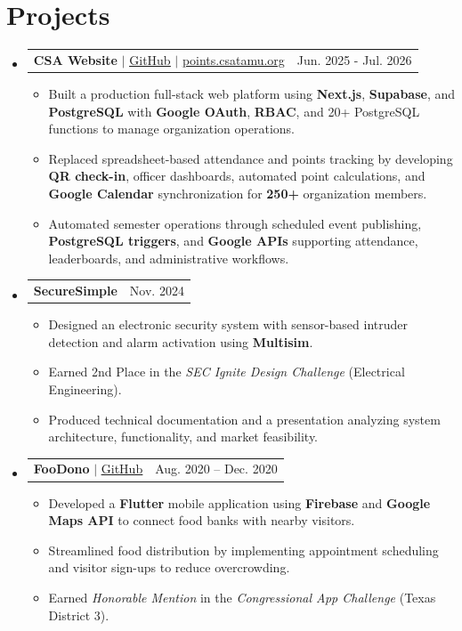 \documentclass[letterpaper,11pt]{article}
\makeatletter
\newcommand{\resumeItem}[1]{
  \item\small{
    {#1 \vspace{-2pt}}
  }
}
\newcommand{\resumeProjectHeading}[2]{
    \item
    \begin{tabular*}{0.97\textwidth}{l@{\extracolsep{\fill}}r}
      \small#1 & #2 \\
    \end{tabular*}\vspace{-7pt}
}
\newcommand{\resumeSubHeadingListStart}{\begin{itemize}[leftmargin=0.15in, label={}]}
\newcommand{\resumeSubHeadingListEnd}{\end{itemize}}
\newcommand{\resumeItemListStart}{\begin{itemize}}
\newcommand{\resumeItemListEnd}{\end{itemize}\vspace{-5pt}}
\makeatother
\begin{document}
\section{Projects}
    \resumeSubHeadingListStart
      \resumeProjectHeading
          {\textbf{CSA Website} $|$ \href{https://github.com/tamucsa/points}{\underline{GitHub}} $|$ \href{https://points.csatamu.org}{\underline{points.csatamu.org}}}{Jun. 2025 - Jul. 2026}
          \resumeItemListStart
            \resumeItem{Built a production full-stack web platform using \textbf{Next.js}, \textbf{Supabase}, and \textbf{PostgreSQL} with \textbf{Google OAuth}, \textbf{RBAC}, and 20+ PostgreSQL functions to manage organization operations.}
            \resumeItem{Replaced spreadsheet-based attendance and points tracking by developing \textbf{QR check-in}, officer dashboards, automated point calculations, and \textbf{Google Calendar} synchronization for \textbf{250+} organization members.}
            \resumeItem{Automated semester operations through scheduled event publishing, \textbf{PostgreSQL triggers}, and \textbf{Google APIs} supporting attendance, leaderboards, and administrative workflows.}
          \resumeItemListEnd
      \resumeProjectHeading
          {\textbf{SecureSimple}}{Nov. 2024}
          \resumeItemListStart
            \resumeItem{Designed an electronic security system with sensor-based intruder detection and alarm activation using \textbf{Multisim}.}
            \resumeItem{Earned 2nd Place in the \textit{SEC Ignite Design Challenge} (Electrical Engineering).}
            \resumeItem{Produced technical documentation and a presentation analyzing system architecture, functionality, and market feasibility.}
          \resumeItemListEnd
      \resumeProjectHeading
          {\textbf{FooDono} $|$ \href{https://github.com/akhilk999/FooDono}{\underline{GitHub}}}{Aug. 2020 -- Dec. 2020}
          \resumeItemListStart
            \resumeItem{Developed a \textbf{Flutter} mobile application using \textbf{Firebase} and \textbf{Google Maps API} to connect food banks with nearby visitors.}
            \resumeItem{Streamlined food distribution by implementing appointment scheduling and visitor sign-ups to reduce overcrowding.}
            \resumeItem{Earned \textit{Honorable Mention} in the \textit{Congressional App Challenge} (Texas District 3).}
          \resumeItemListEnd
    \resumeSubHeadingListEnd
\end{document}
